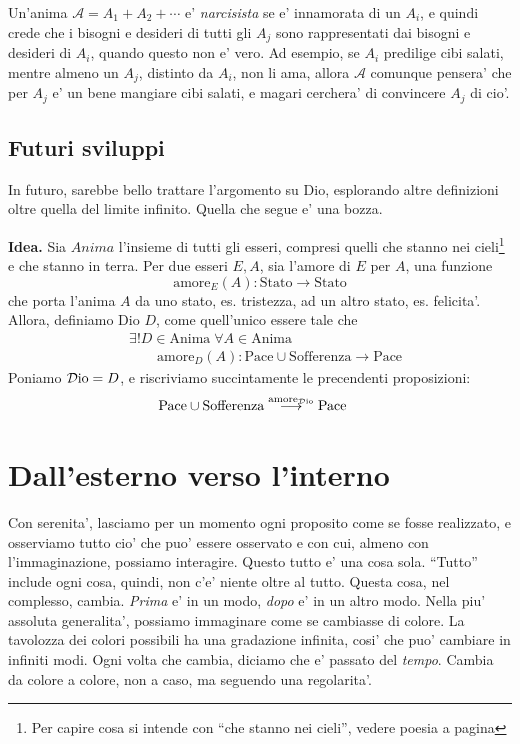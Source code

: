 Un'anima $\mathcal{A}=A_1+A_2+\cdots$ e' \emph{narcisista} se e' innamorata di un $A_i$, e quindi crede che i bisogni e desideri di tutti gli $A_j$ sono rappresentati dai bisogni e desideri di $A_i$, quando questo non e' vero. Ad esempio, se $A_i$ predilige cibi salati, mentre almeno un $A_j$, distinto da $A_i$, non li ama, allora $\mathcal{A}$ comunque pensera' che per $A_j$ e' un bene mangiare cibi salati, e magari cerchera' di convincere $A_j$ di cio'.


\subsection{Futuri sviluppi}
\label{FuturiSviluppiProcAssiomatico}
In futuro, sarebbe bello trattare l'argomento su Dio, esplorando altre definizioni oltre quella del limite infinito.
Quella che segue e' una bozza.

	\textbf{Idea. } Sia $\textit{Anima}$ l'insieme di tutti gli esseri, compresi quelli che stanno nei cieli\footnote{Per capire cosa si intende con ``che stanno nei cieli'', vedere poesia a pagina \pageref{DioScientificamentePoesia}} e che stanno in terra. Per due esseri $E,A$, sia l'amore di $E$ per $A$, una funzione 
    \[\textrm{amore}_E(A):\textrm{Stato}\longrightarrow\textrm{Stato}\]
    che porta l'anima $A$ da uno stato, es. tristezza, ad un altro stato, es. felicita'. Allora, definiamo Dio $D$, come quell'unico essere tale che
    \begin{align}
        &\exists ! D \in \textrm{Anima}\;\forall A \in \textrm{Anima}\;\;\nonumber\\
        &\qquad\textrm{amore}_D(A): \textrm{Pace}\cup\textrm{Sofferenza} \longrightarrow \textrm{Pace}
    \end{align}
    Poniamo $\mathcal{D}\textrm{io}=D$, e riscriviamo succintamente le precendenti proposizioni:
    \begin{align*}
        &\textrm{Pace}\cup\textrm{Sofferenza} \stackrel{\textrm{amore}_{\mathcal{D}\textrm{io}}}{\longrightarrow} \textrm{Pace}
    \end{align*}

\section{Dall'esterno verso l'interno}
\label{extInt}
Con serenita', lasciamo per un momento ogni proposito come se fosse realizzato, e osserviamo tutto cio' che puo' essere osservato e con cui, almeno con l'immaginazione, possiamo interagire. Questo tutto e' una cosa sola. ``Tutto'' include ogni cosa, quindi, non c'e' niente oltre al tutto.
Questa cosa, nel complesso, cambia. \emph{Prima} e' in un modo, \emph{dopo} e' in un altro modo. Nella piu' assoluta generalita', possiamo immaginare come se cambiasse di colore. La tavolozza dei colori possibili ha una gradazione infinita, cosi' che puo' cambiare in infiniti modi. Ogni volta che cambia, diciamo che e' passato del \emph{tempo}. Cambia da colore a colore, non a caso, ma seguendo una regolarita'. 

